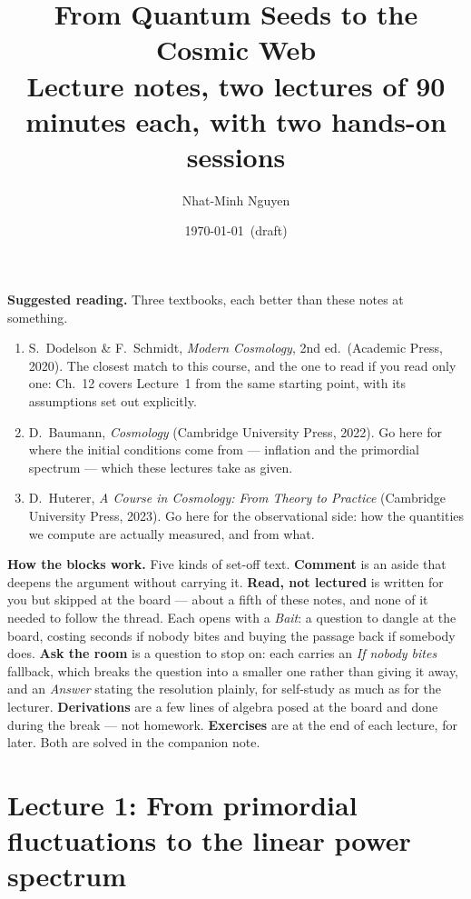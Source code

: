 \documentclass[a4paper,11pt]{article}
\title{From Quantum Seeds to the Cosmic Web\\[2mm]
\large Lecture notes, two lectures of 90 minutes each,
with two hands-on sessions}
\author{Nhat-Minh Nguyen}
\date{\today\ (draft)}
\numberwithin{equation}{section}
\newcounter{exercise}[section]
\begin{document}
\maketitle

\noindent\textbf{Suggested reading.} Three textbooks, each better than these
notes at something.
\begin{enumerate}[itemsep=1pt,topsep=3pt,leftmargin=*]
\item S.~Dodelson \& F.~Schmidt, \emph{Modern Cosmology}, 2nd ed.\ (Academic
  Press, 2020). The closest match to this course, and the one to read if you
  read only one: Ch.~12 covers Lecture~1 from the same starting point, with its
  assumptions set out explicitly.
\item D.~Baumann, \emph{Cosmology} (Cambridge University Press, 2022). Go here
  for where the initial conditions come from --- inflation and the primordial
  spectrum --- which these lectures take as given.
\item D.~Huterer, \emph{A Course in Cosmology: From Theory to Practice}
  (Cambridge University Press, 2023). Go here for the observational side: how
  the quantities we compute are actually measured, and from what.
\end{enumerate}

\medskip
\noindent\textbf{How the blocks work.} Five kinds of set-off text.
\textbf{Comment} is an aside that deepens the argument without carrying it.
\textbf{Read, not lectured} is written for you but skipped at the board ---
about a fifth of these notes, and none of it needed to follow the thread. Each
opens with a \emph{Bait}: a question to dangle at the board, costing seconds if
nobody bites and buying the passage back if somebody does.
\textbf{Ask the room} is a question to stop on: each carries an
\emph{If nobody bites} fallback, which breaks the question into a smaller one
rather than giving it away, and an \emph{Answer} stating the resolution
plainly, for self-study as much as for the lecturer. \textbf{Derivations} are
a few lines of algebra posed at the board and done during the break --- not
homework. \textbf{Exercises} are at the end of each lecture, for later. Both
are solved in the companion note.


\tableofcontents

\section*{Lecture 1: From primordial fluctuations to the linear power spectrum}
\setcounter{section}{1}
\setcounter{subsection}{0}
\setcounter{equation}{0}
\setcounter{exercise}{0}
\end{document}
